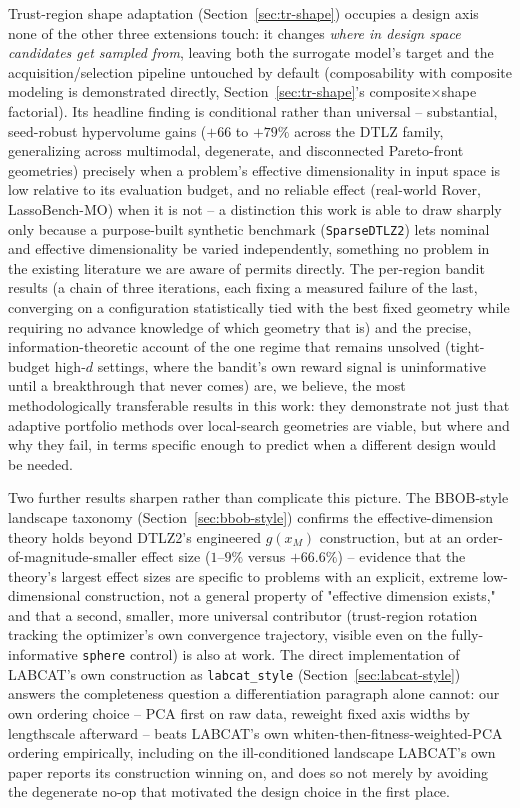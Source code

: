 \documentclass[11pt]{article}
\begin{document}
Trust-region shape adaptation (Section~\ref{sec:tr-shape}) occupies a
design axis none of the other three extensions touch: it changes
\emph{where in design space candidates get sampled from}, leaving both the
surrogate model's target and the acquisition/selection pipeline
untouched by default (composability with composite modeling is
demonstrated directly, Section~\ref{sec:tr-shape}'s composite$\times$shape
factorial). Its headline finding is conditional rather than universal --
substantial, seed-robust hypervolume gains ($+66$ to $+79\%$ across the
DTLZ family, generalizing across multimodal, degenerate, and disconnected
Pareto-front geometries) precisely when a problem's effective
dimensionality in input space is low relative to its evaluation budget,
and no reliable effect (real-world Rover, LassoBench-MO) when it is not
-- a distinction this work is able to draw sharply only because a
purpose-built synthetic benchmark (\texttt{SparseDTLZ2}) lets nominal and
effective dimensionality be varied independently, something no problem in
the existing literature we are aware of permits directly. The
per-region bandit results (a chain of three iterations, each fixing a
measured failure of the last, converging on a configuration
statistically tied with the best fixed geometry while requiring no advance
knowledge of which geometry that is) and the precise, information-theoretic
account of the one regime that remains unsolved (tight-budget high-$d$
settings, where the bandit's own reward signal is uninformative until a
breakthrough that never comes) are, we believe, the most methodologically
transferable results in this work: they demonstrate not just that
adaptive portfolio methods over local-search geometries are viable, but
where and why they fail, in terms specific enough to predict when a
different design would be needed.

Two further results sharpen rather than complicate this picture. The
BBOB-style landscape taxonomy (Section~\ref{sec:bbob-style}) confirms the
effective-dimension theory holds beyond DTLZ2's engineered $g(x_M)$
construction, but at an order-of-magnitude-smaller effect size ($1$--$9\%$
versus $+66.6\%$) -- evidence that the theory's largest effect sizes are
specific to problems with an explicit, extreme low-dimensional
construction, not a general property of "effective dimension exists,"
and that a second, smaller, more universal contributor (trust-region
rotation tracking the optimizer's own convergence trajectory, visible even
on the fully-informative \texttt{sphere} control) is also at work. The
direct implementation of LABCAT's own construction as \texttt{labcat\_style}
(Section~\ref{sec:labcat-style}) answers the completeness question a
differentiation paragraph alone cannot: our own ordering choice --
PCA first on raw data, reweight fixed axis widths by lengthscale
afterward -- beats LABCAT's own whiten-then-fitness-weighted-PCA ordering
empirically, including on the ill-conditioned landscape LABCAT's own paper
reports its construction winning on, and does so not merely by avoiding
the degenerate no-op that motivated the design choice in the first place.
\end{document}
